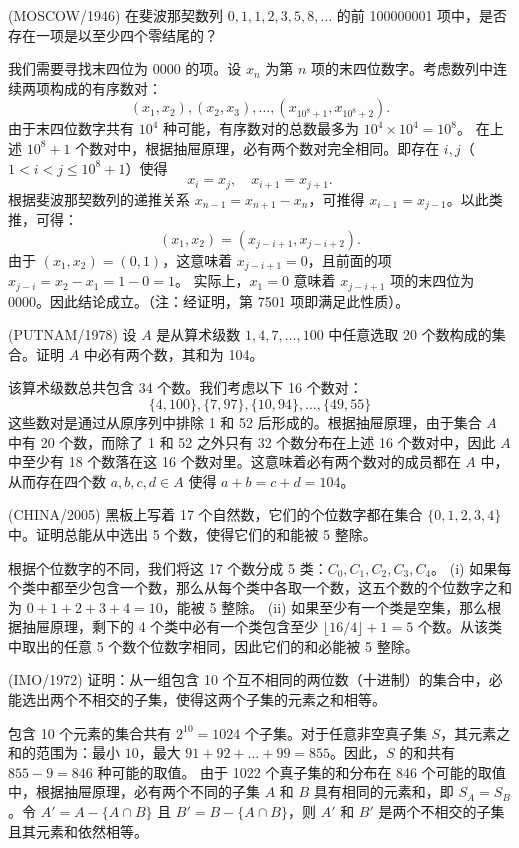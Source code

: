 \begin{questions}
\question (MOSCOW/1946) 在斐波那契数列 $0, 1, 1, 2, 3, 5, 8, \dots$ 的前 100000001 项中，是否存在一项是以至少四个零结尾的？
\begin{solution}
我们需要寻找末四位为 0000 的项。设 $x_n$ 为第 $n$ 项的末四位数字。考虑数列中连续两项构成的有序数对：
\[
(x_1, x_2), (x_2, x_3), \dots, (x_{10^8+1}, x_{10^8+2}).
\]
由于末四位数字共有 $10^4$ 种可能，有序数对的总数最多为 $10^4 \times 10^4 = 10^8$。
在上述 $10^8 + 1$ 个数对中，根据抽屉原理，必有两个数对完全相同。即存在 $i, j$（$1 < i < j \le 10^8 + 1$）使得
\[
x_i = x_j, \quad x_{i+1} = x_{j+1}.
\]
根据斐波那契数列的递推关系 $x_{n-1} = x_{n+1} - x_n$，可推得 $x_{i-1} = x_{j-1}$。以此类推，可得：
\[
(x_1, x_2) = (x_{j-i+1}, x_{j-i+2}).
\]
由于 $(x_1, x_2) = (0, 1)$，这意味着 $x_{j-i+1} = 0$，且前面的项 $x_{j-i} = x_2 - x_1 = 1 - 0 = 1$。
实际上，$x_1 = 0$ 意味着 $x_{j-i+1}$ 项的末四位为 0000。因此结论成立。（注：经证明，第 7501 项即满足此性质）。
\end{solution}

\question (PUTNAM/1978) 设 $A$ 是从算术级数 $1, 4, 7, \dots, 100$ 中任意选取 20 个数构成的集合。证明 $A$ 中必有两个数，其和为 104。
\begin{solution}
该算术级数总共包含 34 个数。我们考虑以下 16 个数对：
\[ \{4, 100\}, \{7, 97\}, \{10, 94\}, \dots, \{49, 55\} \]
这些数对是通过从原序列中排除 1 和 52 后形成的。根据抽屉原理，由于集合 $A$ 中有 20 个数，而除了 1 和 52 之外只有 32 个数分布在上述 16 个数对中，因此 $A$ 中至少有 18 个数落在这 16 个数对里。这意味着必有两个数对的成员都在 $A$ 中，从而存在四个数 $a, b, c, d \in A$ 使得 $a + b = c + d = 104$。
\end{solution}

\question (CHINA/2005) 黑板上写着 17 个自然数，它们的个位数字都在集合 $\{0, 1, 2, 3, 4\}$ 中。证明总能从中选出 5 个数，使得它们的和能被 5 整除。
\begin{solution}
根据个位数字的不同，我们将这 17 个数分成 5 类：$C_0, C_1, C_2, C_3, C_4$。
(i) 如果每个类中都至少包含一个数，那么从每个类中各取一个数，这五个数的个位数字之和为 $0+1+2+3+4 = 10$，能被 5 整除。
(ii) 如果至少有一个类是空集，那么根据抽屉原理，剩下的 4 个类中必有一个类包含至少 $\lfloor 16/4 \rfloor + 1 = 5$ 个数。从该类中取出的任意 5 个数个位数字相同，因此它们的和必能被 5 整除。
\end{solution}

\question (IMO/1972) 证明：从一组包含 10 个互不相同的两位数（十进制）的集合中，必能选出两个不相交的子集，使得这两个子集的元素之和相等。
\begin{solution}
包含 10 个元素的集合共有 $2^{10} = 1024$ 个子集。对于任意非空真子集 $S$，其元素之和的范围为：最小 $10$，最大 $91+92+\dots+99 = 855$。因此，$S$ 的和共有 $855 - 9 = 846$ 种可能的取值。
由于 1022 个真子集的和分布在 846 个可能的取值中，根据抽屉原理，必有两个不同的子集 $A$ 和 $B$ 具有相同的元素和，即 $S_A = S_B$。令 $A' = A - \{A \cap B\}$ 且 $B' = B - \{A \cap B\}$，则 $A'$ 和 $B'$ 是两个不相交的子集且其元素和依然相等。
\end{solution}


\end{questions}
